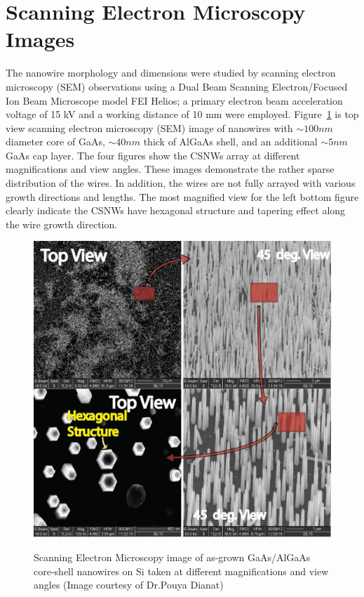 \section{Scanning Electron Microscopy Images} 

The nanowire morphology and dimensions were studied by scanning electron
microscopy (SEM) observations using a Dual Beam Scanning Electron/Focused Ion
Beam Microscope model FEI Helios; a primary electron beam acceleration voltage
of 15 kV and a working distance of 10 mm were employed. Figure~\ref{SEMNW} is
top view scanning electron microscopy (SEM) image of nanowires with $\sim100nm$
diameter core of GaAs, $\sim40nm$ thick of AlGaAs shell, and an additional
$\sim5nm$ GaAs cap layer. The four figures show the CSNWs array at different
magnifications and view angles. These images demonstrate the rather sparse
distribution of the wires. In addition, the wires are not fully arrayed with
various growth directions and lengths. The most magnified view for the left
bottom figure clearly indicate the CSNWs have hexagonal structure and tapering
effect along the wire growth direction.

\begin{figure}
  \caption{Scanning Electron Microscopy image of as-grown GaAs/AlGaAs core-shell nanowires on Si taken at different magnifications and view angles (Image courtesy of Dr.Pouya Dianat)}
  \centering
  \includegraphics[width=\textwidth]{pictures/Data/SEMNW}
  \label{SEMNW}
\end{figure}


